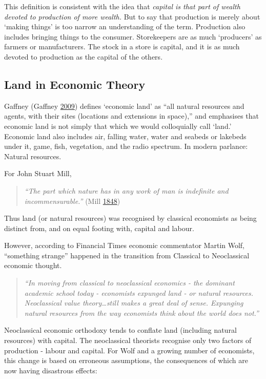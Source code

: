 \documentclass[]{tufte-handout}
\begin{document}
This definition is consistent with the idea that \emph{capital is that
part of wealth devoted to production of more wealth.} But to say that
production is merely about `making things' is too narrow an
understanding of the term. Production also includes bringing things to
the consumer. Storekeepers are as much `producers' as farmers or
manufacturers. The stock in a store is capital, and it is as much
devoted to production as the capital of the others.

\hypertarget{land-in-economic-theory}{%
\subsection{Land in Economic Theory}\label{land-in-economic-theory}}

Gaffney (Gaffney \protect\hyperlink{ref-Gaffney2009}{2009}) defines
`economic land' as ``all natural resources and agents, with their sites
(locations and extensions in space),'' and emphasises that economic land
is not simply that which we would colloquially call `land.' Economic
land also includes air, falling water, water and seabeds or lakebeds
under it, game, fish, vegetation, and the radio spectrum. In modern
parlance: Natural resources.

For John Stuart Mill,

\begin{quote}
\emph{``The part which nature has in any work of man is indefinite and
incommensurable.''} (Mill
\protect\hyperlink{ref-mill1848principles}{1848})
\end{quote}

Thus land (or natural resources) was recognised by classical economists
as being distinct from, and on equal footing with, capital and labour.

However, according to Financial Times economic commentator Martin Wolf,
``something strange'' happened in the transition from Classical to
Neoclassical economic thought.

\begin{quote}
\emph{``In moving from classical to neoclassical economics - the
dominant academic school today - economists expunged land - or natural
resources. Neoclassical value theory\ldots{}still makes a great deal of
sense. Expunging natural resources from the way economists think about
the world does not.''}
\end{quote}

Neoclassical economic orthodoxy tends to conflate land (including
natural resources) with capital. The neoclassical theorists recognise
only two factors of production - labour and capital. For Wolf and a
growing number of economists, this change is based on erroneous
assumptions, the consequences of which are now having disastrous
effects:
\end{document}
